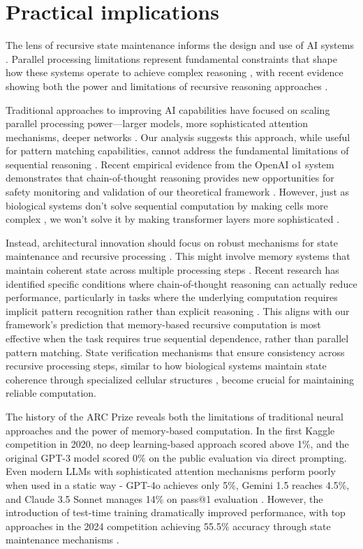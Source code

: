 \documentclass[12pt]{article}
\begin{document}
\section{Practical implications}

The lens of recursive state maintenance informs the design and use of AI systems \cite{dickson2024trust,ahn2024recursive,openai2024o1}.
Parallel processing limitations represent fundamental constraints that shape how these systems operate to achieve complex reasoning \cite{merrill2023parallelism}, with recent evidence showing both the power and limitations of recursive reasoning approaches \cite{liu2024mind}.

Traditional approaches to improving AI capabilities have focused on scaling parallel processing power---larger models, more sophisticated attention mechanisms, deeper networks \cite{shallue2019measuring}.
Our analysis suggests this approach, while useful for pattern matching capabilities, cannot address the fundamental limitations of sequential reasoning \cite{peng2024limitations}.
Recent empirical evidence from the OpenAI o1 system demonstrates that chain-of-thought reasoning provides new opportunities for safety monitoring and validation of our theoretical framework \cite{openai2024o1}.
However, just as biological systems don't solve sequential computation by making cells more complex \cite{wang2023parallel}, we won't solve it by making transformer layers more sophisticated \cite{zhao2024epha}.

Instead, architectural innovation should focus on robust mechanisms for state maintenance and recursive processing \cite{jung2020new}.
This might involve memory systems that maintain coherent state across multiple processing steps \cite{zhu2024overcoming}.
Recent research has identified specific conditions where chain-of-thought reasoning can actually reduce performance, particularly in tasks where the underlying computation requires implicit pattern recognition rather than explicit reasoning \cite{liu2024mind}.
This aligns with our framework's prediction that memory-based recursive computation is most effective when the task requires true sequential dependence, rather than parallel pattern matching.
State verification mechanisms that ensure consistency across recursive processing steps, similar to how biological systems maintain state coherence through specialized cellular structures \cite{espinosa2024molecular}, become crucial for maintaining reliable computation.

The history of the ARC Prize reveals both the limitations of traditional neural approaches and the power of memory-based computation. In the first Kaggle competition in 2020, no deep learning-based approach scored above 1\%, and the original GPT-3 model scored 0\% on the public evaluation via direct prompting. Even modern LLMs with sophisticated attention mechanisms perform poorly when used in a static way - GPT-4o achieves only 5\%, Gemini 1.5 reaches 4.5\%, and Claude 3.5 Sonnet manages 14\% on pass@1 evaluation \cite{chollet2024arc}. However, the introduction of test-time training dramatically improved performance, with top approaches in the 2024 competition achieving 55.5\% accuracy through state maintenance mechanisms \cite{chollet2024arc}.
\end{document}
